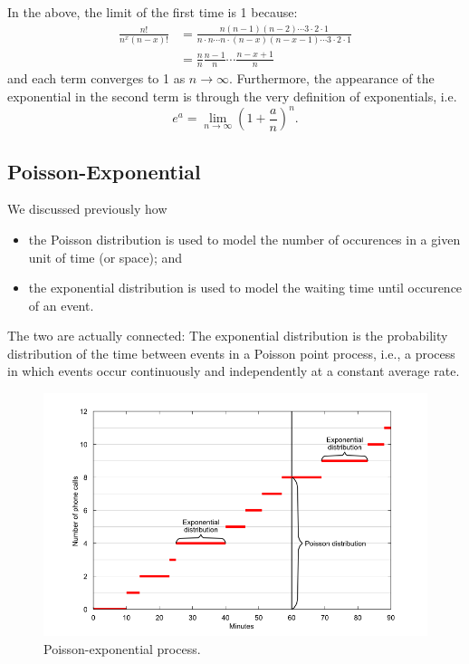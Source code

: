 \documentclass[
]{book}
\providecommand{\tightlist}{%
  \setlength{\itemsep}{0pt}\setlength{\parskip}{0pt}}
\theoremstyle{definition}
\theoremstyle{definition}
\theoremstyle{definition}
\theoremstyle{definition}
\theoremstyle{remark}
\begin{document}
In the above, the limit of the first time is 1 because:
\begin{align*}
\frac{n!}{n^x(n-x)!}
&= \frac{n(n-1)(n-2)\cdots 3\cdot 2 \cdot 1}{n \cdot n \cdots n \cdot (n-x)(n-x-1)\cdots 3\cdot 2 \cdot 1} \\
&= \frac{n}{n}\frac{n-1}{n} \cdots \frac{n-x+1}{n}
\end{align*}
and each term converges to 1 as \(n\to\infty\).
Furthermore, the appearance of the exponential in the second term is through the very definition of exponentials, i.e.
\[
e^a = \lim_{n\to\infty }\left(1 + \frac{a}{n} \right)^n.
\]

\hypertarget{poisson-exponential}{%
\subsection{Poisson-Exponential}\label{poisson-exponential}}

We discussed previously how

\begin{itemize}
\tightlist
\item
  the Poisson distribution is used to model the number of occurences in a given unit of time (or space); and
\item
  the exponential distribution is used to model the waiting time until occurence of an event.
\end{itemize}

The two are actually connected: The exponential distribution is the probability distribution of the time between events in a Poisson point process, i.e., a process in which events occur continuously and independently at a constant average rate.

\begin{figure}

{\centering \includegraphics[width=0.9\linewidth]{figure/exp_poisson_process} 

}

\caption{Poisson-exponential process.}\label{fig:exppoissonprocess}
\end{figure}
\end{document}
